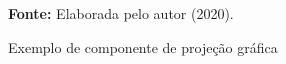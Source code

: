 \begin{figure}[ht!]
\centering

\caption{\textmd{Exemplo de componente de projeção gráfica}}
\label{fig:swingbutton}

\par\medskip\textbf{Fonte:} Elaborada pelo autor (2020). \par\medskip

\end{figure}

